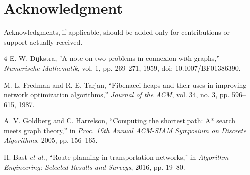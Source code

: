\documentclass[conference]{IEEEtran}
\begin{document}
\section*{Acknowledgment}
Acknowledgments, if applicable, should be added only for contributions or support actually received.

\balance
\begin{thebibliography}{4}
E. W. Dijkstra, ``A note on two problems in connexion with graphs,''
\textit{Numerische Mathematik}, vol. 1, pp. 269--271, 1959,
doi: 10.1007/BF01386390.

M. L. Fredman and R. E. Tarjan, ``Fibonacci heaps and their uses in
improving network optimization algorithms,'' \textit{Journal of the ACM},
vol. 34, no. 3, pp. 596--615, 1987.

A. V. Goldberg and C. Harrelson, ``Computing the shortest path: A* search
meets graph theory,'' in \textit{Proc. 16th Annual ACM-SIAM Symposium on
Discrete Algorithms}, 2005, pp. 156--165.

H. Bast \textit{et al.}, ``Route planning in transportation networks,''
in \textit{Algorithm Engineering: Selected Results and Surveys}, 2016,
pp. 19--80.
\end{thebibliography}
\end{document}

